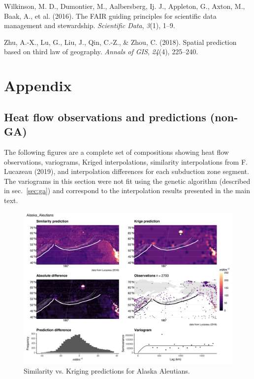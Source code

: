 \documentclass[draft,linenumbers]{agujournal2018}
\begin{document}
\leavevmode{}%
Wilkinson, M. D., Dumontier, M., Aalbersberg, Ij. J., Appleton, G.,
Axton, M., Baak, A., et al. (2016). The FAIR guiding principles for
scientific data management and stewardship. \emph{Scientific Data},
\emph{3}(1), 1--9.

\leavevmode{}%
Zhu, A.-X., Lu, G., Liu, J., Qin, C.-Z., \& Zhou, C. (2018). Spatial
prediction based on third law of geography. \emph{Annals of GIS},
\emph{24}(4), 225--240.

\section{Appendix}

\hypertarget{sec:comps}{%
\subsection{Heat flow observations and predictions
(non-GA)}\label{sec:comps}}

The following figures are a complete set of compositions showing heat
flow observations, variograms, Kriged interpolations, similarity
interpolations from F. Lucazeau (2019), and interpolation differences
for each subduction zone segment. The variograms in this section were
not fit using the genetic algorithm (described in sec.~\ref{sec:ga}) and
correspond to the interpolation results presented in the main text.

\begin{figure}[h]

{\centering \includegraphics[width=0.95\linewidth,]{../figs/diff/comp/Alaska_Aleutians} 

}

\caption{Similarity vs. Kriging predictions for Alaska Aleutians.}\label{fig:alaska.comp}
\end{figure}
\end{document}
